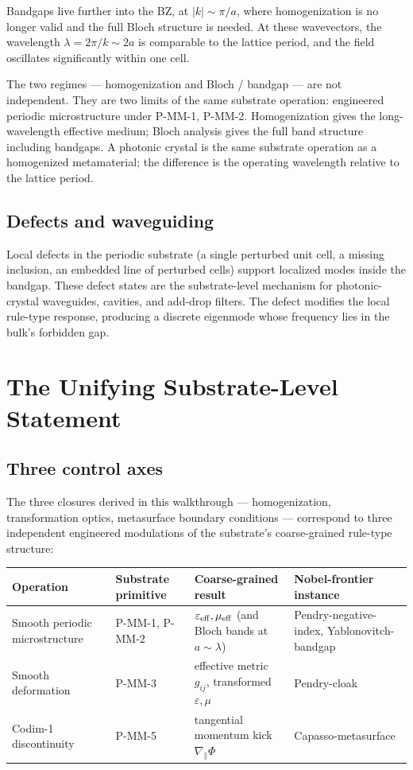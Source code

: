 \documentclass[11pt,a4paper]{article}
\begin{document}
Bandgaps live further into the BZ, at $|k| \sim \pi/a$, where homogenization is no longer valid and the full Bloch structure is needed. At these wavevectors, the wavelength $\lambda = 2\pi/k \sim 2a$ is comparable to the lattice period, and the field oscillates significantly within one cell.

The two regimes --- homogenization and Bloch / bandgap --- are not independent. They are two limits of the same substrate operation: engineered periodic microstructure under P-MM-1, P-MM-2. Homogenization gives the long-wavelength effective medium; Bloch analysis gives the full band structure including bandgaps. A photonic crystal is the same substrate operation as a homogenized metamaterial; the difference is the operating wavelength relative to the lattice period.

\subsection{Defects and waveguiding}

Local defects in the periodic substrate (a single perturbed unit cell, a missing inclusion, an embedded line of perturbed cells) support localized modes inside the bandgap. These defect states are the substrate-level mechanism for photonic-crystal waveguides, cavities, and add-drop filters. The defect modifies the local rule-type response, producing a discrete eigenmode whose frequency lies in the bulk's forbidden gap.

\section{The Unifying Substrate-Level Statement}

\subsection{Three control axes}

The three closures derived in this walkthrough --- homogenization, transformation optics, metasurface boundary conditions --- correspond to three independent engineered modulations of the substrate's coarse-grained rule-type structure:

\begin{center}
\footnotesize
\begin{tabular}{p{}p{}p{}p{}}
\toprule
\textbf{Operation} & \textbf{Substrate primitive} & \textbf{Coarse-grained result} & \textbf{Nobel-frontier instance} \\
\midrule
Smooth periodic microstructure & P-MM-1, P-MM-2 & $\varepsilon_{\rm eff}, \mu_{\rm eff}$ (and Bloch bands at $a\sim\lambda$) & Pendry-negative-index, Yablonovitch-bandgap \\
Smooth deformation & P-MM-3 & effective metric $g_{ij}$, transformed $\varepsilon, \mu$ & Pendry-cloak \\
Codim-1 discontinuity & P-MM-5 & tangential momentum kick $\nabla_\parallel\Phi$ & Capasso-metasurface \\
\bottomrule
\end{tabular}
\end{center}
\end{document}
